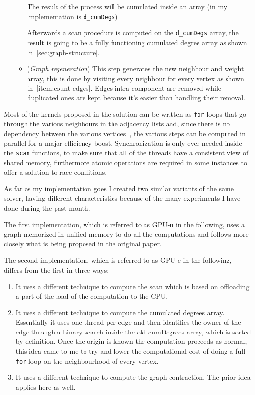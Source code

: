 \documentclass[a4paper,10pt]{article}
\begin{document}
\begin{enumerate}
\begin{itemize}
		The result of the process will be cumulated inside an array (in my
		implementation is \texttt{d\_cumDegs})

		Afterwards a scan procedure is computed on the \texttt{d\_cumDegs}
		array, the result is going to be a fully functioning cumulated
		degree array as shown in~\ref{sec:graph-structure}.
		\item\label{item:graph-regen} (\textit{Graph regeneration}) This step
		generates the new neighbour and weight array, this is done by
		visiting every neighbour for every vertex as shown in~\ref{item:count-edges}. Edges intra-component are removed while duplicated ones are kept because it's easier than handling their removal.
	\end{itemize}
\end{enumerate}
Most of the kernels proposed in the solution can be written as \texttt{for} loops that go through
the various neighbours in the adjacency lists and, since there is no dependency between the various vertices~\cite{generic-he-boruvka}, the various steps can be computed in parallel for a major efficiency boost. Synchronization is only ever needed inside the \texttt{scan} functions, to make sure that all of the threads have a consistent view of shared memory, furthermore atomic operations are required in some instances to offer a solution to race conditions.

As far as my implementation goes I created two similar variants of the same solver, having different characteristics because of the many experiments I have done during the past month.

The first implementation, which is referred to as GPU-u in the following, uses a graph memorized in unified memory to do all the computations and follows more closely what is being proposed in the original paper.

The second implementation, which is referred to as GPU-e in the following, differs from the first in three ways:
\begin{enumerate}
	\item It uses a different technique to compute the scan which is based on offloading a part of the load of the computation to the CPU.
	\item It uses a different technique to compute the cumulated degrees array. Essentially it uses one thread per edge and then identifies the owner of the edge through a binary search inside the old cumDegrees array, which is sorted by definition. Once the origin is known the computation proceeds as normal, this idea came to me to try and lower the computational cost of doing a full \texttt{for} loop on the neighbourhood of every vertex.
	\item It uses a different technique to compute the graph contraction. The prior idea applies here as well.
\end{enumerate}
\end{document}
